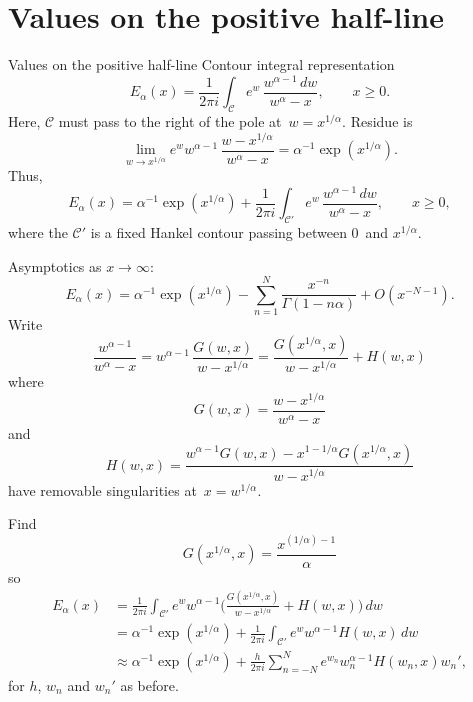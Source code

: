 \documentclass{beamer}
\begin{document}
\section{Values on the positive half-line}
\begin{frame}{Values on the positive half-line}
Contour integral representation
\[
E_\alpha(x)=\frac{1}{2\pi i}\int_{\mathcal{C}}e^w\,
    \frac{w^{\alpha-1}\,dw}{w^\alpha-x},\qquad x\ge0.
\]
Here, $\mathcal{C}$ must pass to the right of the pole at~$w=x^{1/\alpha}$.
Residue is
\[
\lim_{w\to x^{1/\alpha}}e^w w^{\alpha-1}\,
    \frac{w-x^{1/\alpha}}{w^\alpha-x}=\alpha^{-1}\exp(x^{1/\alpha}).
\]
Thus,
\[
E_\alpha(x)=\alpha^{-1}\exp(x^{1/\alpha})
    +\frac{1}{2\pi i}\int_{\mathcal{C'}}e^w\,
    \frac{w^{\alpha-1}\,dw}{w^\alpha-x},\qquad x\ge0,
\]
where the $\mathcal{C}'$ is a fixed Hankel contour passing between $0$~and 
$x^{1/\alpha}$.
\end{frame}

\begin{frame}
Asymptotics as $x\to\infty$:
\[
E_\alpha(x)=\alpha^{-1}\exp(x^{1/\alpha})-\sum_{n=1}^N
    \frac{x^{-n}}{\Gamma(1-n\alpha)}+O(x^{-N-1}).
\]
Write
\[
\frac{w^{\alpha-1}}{w^\alpha-x}=w^{\alpha-1}\,\frac{G(w,x)}{w-x^{1/\alpha}}
    =\frac{G(x^{1/\alpha},x)}{w-x^{1/\alpha}}+H(w,x)
\]
where
\[
G(w,x)=\frac{w-x^{1/\alpha}}{w^\alpha-x}
\]
and
\[
H(w,x)=\frac{w^{\alpha-1}G(w,x)-x^{1-1/\alpha}G(x^{1/\alpha},x)}%
{w-x^{1/\alpha}}
\]
have removable singularities at~$x=w^{1/\alpha}$.
\end{frame}
\begin{frame}
Find
\[
G(x^{1/\alpha},x)=\frac{x^{(1/\alpha)-1}}{\alpha}
\]
so
\begin{align*}
E_\alpha(x)&=\frac{1}{2\pi i}\int_{\mathcal{C}'}e^w w^{\alpha-1}
    \biggl(\frac{G(x^{1/\alpha},x)}{w-x^{1/\alpha}}+H(w,x)\biggr)\,dw\\
    &=\alpha^{-1}\exp(x^{1/\alpha})
    +\frac{1}{2\pi i}\int_{\mathcal{C}'}e^w w^{\alpha-1}H(w,x)\,dw\\
    &\approx\alpha^{-1}\exp(x^{1/\alpha})
    +\frac{h}{2\pi i}\sum_{n=-N}^Ne^{w_n}w_n^{\alpha-1}H(w_n,x)w_n',
\end{align*}
for $h$, $w_n$ and $w_n'$ as before.


\end{frame}


\end{document}
